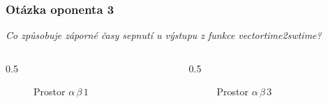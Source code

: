 \documentclass[%
  12pt,       				%
	t,                  %
	aspectratio=1610,   %
	unicode,						%
]{beamer}				    	%
\begin{document}
\begin{frame}
	\frametitle{Otázka oponenta 3}
	\emph{Co způsobuje záporné časy sepnutí u výstupu z funkce vectortime2swtime?}\\[2ex]
	\begin{columns}
		\begin{column}{0.5\textwidth}
			
			\begin{figure}
				\centering
				
					\centering
					
					\caption{Prostor $\alpha \, \beta \,1$ }
					\label{fig:svm detail vlevo}
				\end{figure}
				
			\end{column}
			\begin{column}{0.5\textwidth}
				\begin{figure}
					\centering
					\resizebox{!}{0.75\height}{
					
					}
					\caption{Prostor $\alpha \, \beta \,3$}
					\label{fig:svm detail vpravo}
				\end{figure}
				
				
			
			\end{column}
		\end{columns}
\end{frame}
\end{document}
